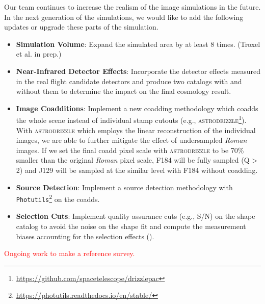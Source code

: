 \documentclass[fleqn,usenatbib]{mnras}
\begin{document}
Our team continues to increase the realism of the image simulations in the future. In the next generation of the simulations, we would like to add the following updates or upgrade these parts of the simulation. 
\begin{itemize}
    \setlength\itemsep{1em}
    \item \textbf{Simulation Volume}: Expand the simulated area by at least 8 times. (Troxel et al. in prep.)
    
    \item \textbf{Near-Infrared Detector Effects}: Incorporate the detector effects measured in the real flight candidate detectors and produce two catalogs with and without them to determine the impact on the final cosmology result.
    
    \item \textbf{Image Coadditions}: Implement a new coadding methodology which coadds the whole scene instead of individual stamp cutouts (e.g., \textsc{astrodrizzle}\footnote{\url{https://github.com/spacetelescope/drizzlepac}}). With \textsc{astrodrizzle} which employs the linear reconstruction of the individual images, we are able to further mitigate the effect of undersampled \emph{Roman} images. If we set the final coadd pixel scale with \textsc{astrodrizzle} to be 70\% smaller than the original \emph{Roman} pixel scale, F184 will be fully sampled (Q > 2) and J129 will be sampled at the similar level with F184 without coadding. 
    
    \item \textbf{Source Detection}: Implement a source detection methodology with \texttt{Photutils}\footnote{\url{https://photutils.readthedocs.io/en/stable/}} on the coadds.
    
    \item \textbf{Selection Cuts}: Implement quality assurance cuts (e.g., S/N) on the shape catalog to avoid the noise on the shape fit and compute the measurement biases accounting for the selection effects (\citealt{2017ApJ...841...24S}). 
\end{itemize}
\textcolor{red}{Ongoing work to make a reference survey. }
\end{document}
